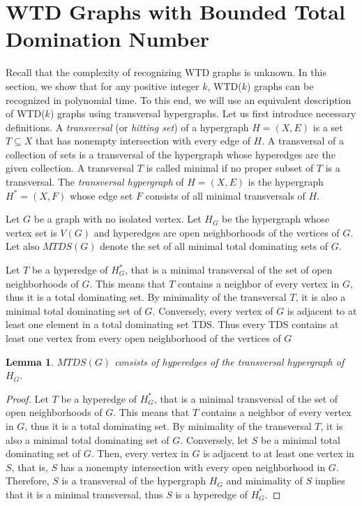 \documentclass[11pt]{article}
\newtheorem{lemma}[theorem]{Lemma}
\theoremstyle{definition}
\begin{document}
\section{WTD Graphs with Bounded Total Domination Number}\label{sec:recWTD}

Recall that the complexity of recognizing WTD graphs is unknown. In this section, we show that for any positive integer $k$, WTD($k$) graphs can be recognized in polynomial time. 
To this end, we will use an equivalent description of WTD($k$) graphs using transversal hypergraphs. 
Let us first introduce necessary definitions. 
A \emph{transversal} (or \emph{hitting set}) of a hypergraph $H = (X, E)$ is a set $T\subseteq X$ that has nonempty intersection with every edge of $H$.
A transversal of a collection of sets is a transversal of the hypergraph whose hyperedges are the given collection.
A transversal $T$ is called minimal if no proper subset of $T$ is a transversal.
The \emph{transversal hypergraph} of $H=(X,E)$ is the hypergraph $H^*=(X, F)$ whose edge set $F$ consists of all minimal transversals of $H$.

Let $G$ be a graph with no isolated vertex.
Let $H_G$ be the hypergraph whose vertex set is $V(G)$ and hyperedges are open neighborhoods of the vertices of $G$.
Let also $MTDS(G)$ denote the set of all minimal total dominating sets of $G$.

Let $T$ be a hyperedge of $H_G^*$, that is a minimal transversal of the set of open neighborhoods of $G$. This means that $T$ contains a neighbor of every vertex in $G$, thus it is a total dominating set. By minimality of the transversal $T$, it is also a minimal total dominating set of $G$. Conversely, every vertex of $G$ is adjacent to at least one element in a total dominating set TDS. Thus every TDS contains at least one vertex from every open neighborhood of the vertices of $G$

\begin{lemma}\label{lem:hg}
$MTDS(G)$ consists of hyperedges of the transversal hypergraph of $H_G$.
\end{lemma}
\begin{proof}
Let $T$ be a hyperedge of $H_G^*$, that is a minimal transversal of the set of open neighborhoods of $G$. 
This means that $T$ contains a neighbor of every vertex in $G$, thus it is a total dominating set. 
By minimality of the transversal $T$, it is also a minimal total dominating set of $G$. 
Conversely, let $S$ be a minimal total dominating set of $G$.
Then, every vertex in $G$ is adjacent to at least one vertex in $S$, that is, $S$ has a nonempty intersection with every open neighborhood in $G$.
Therefore, $S$ is a transversal of the hypergraph $H_G$ and minimality of $S$ implies that it is a minimal transversal, thus $S$ is a hyperedge of $H_G^*$.
\end{proof}
\end{document}
